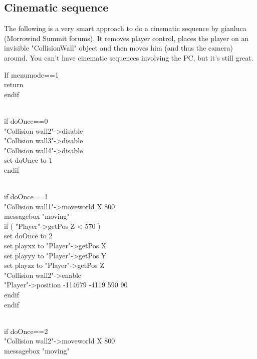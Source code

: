 \documentclass[
]{article}
\begin{document}


\hypertarget{cinematic-sequence}{%
\subsection{\texorpdfstring{\hfill\break
Cinematic sequence}{ Cinematic sequence}}\label{cinematic-sequence}}

The following is a very smart approach to do a cinematic sequence by
gianluca (Morrowind Summit forums). It removes player control, places
the player on an invisible "CollisionWall" object and then moves him
(and thus the camera) around. You can't have cinematic sequences
involving the PC, but it's still great.

If menumode==1\\
return\\
endif\\
\strut \\
if doOnce==0\\
"Collision wall2"-\textgreater disable\\
"Collision wall3"-\textgreater disable\\
"Collision wall4"-\textgreater disable\\
set doOnce to 1\\
endif\\
\strut \\
if doOnce==1\\
"Collision wall1"-\textgreater moveworld X 800\\
messagebox "moving"\\
if ( "Player"-\textgreater getPos Z \textless{} 570 )\\
set doOnce to 2\\
set playxx to "Player"-\textgreater getPos X\\
set playyy to "Player"-\textgreater getPos Y\\
set playzz to "Player"-\textgreater getPos Z\\
"Collision wall2"-\textgreater enable\\
"Player"-\textgreater position -114679 -4119 590 90\\
endif\\
endif\\
\strut \\
if doOnce==2\\
"Collision wall2"-\textgreater moveworld X 800\\
messagebox "moving"\\
\end{document}
